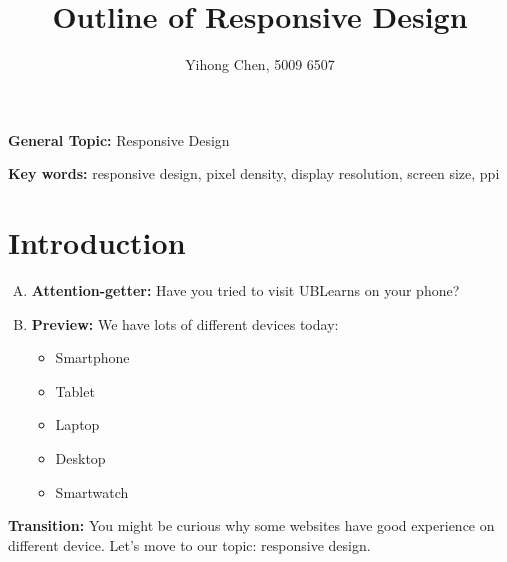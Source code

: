 \documentclass{article}
\title{Outline of Responsive Design}
\author{Yihong Chen, 5009 6507}
\begin{document}
\maketitle

\noindent \textbf{General Topic:} Responsive Design

\noindent \textbf{Key words:} responsive design, pixel density, display resolution, screen size, ppi

\section{Introduction}
\begin{enumerate}[A.]
\item \textbf{Attention-getter:} Have you tried to visit UBLearns on your phone?
\item \textbf{Preview:} We have lots of different devices today:
  \begin{itemize}
  \item Smartphone
  \item Tablet
  \item Laptop
  \item Desktop
  \item Smartwatch
  \end{itemize}
\end{enumerate}
\textbf{Transition:} You might be curious why some websites have good experience on different device. Let's move to our topic: responsive design.
\end{document}
